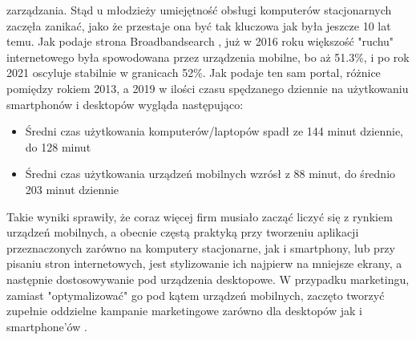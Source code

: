 \documentclass[12pt, a4paper]{article}
\begin{document}
\begin{sloppypar}
{{    zarządzania. Stąd u młodzieży umiejętność obsługi komputerów stacjonarnych
    zaczęła zanikać, jako że przestaje ona być tak kluczowa jak była jeszcze 10 lat
    temu. Jak podaje strona Broadbandsearch \cite{dvm}, już w 2016 roku większość "ruchu"
    internetowego była spowodowana przez urządzenia mobilne, bo aż 51.3\%, i po 
    rok 2021 oscyluje stabilnie w granicach 52\%. Jak podaje ten sam portal,
    różnice pomiędzy rokiem 2013, a 2019 w ilości czasu spędzanego dziennie na 
    użytkowaniu smartphonów i desktopów wygląda następująco:
    \begin{itemize}
      \item Średni czas użytkowania komputerów/laptopów spadł ze 144 minut dziennie, do 128 minut
      \item Średni czas użytkowania urządzeń mobilnych wzrósł z 88 minut, do średnio 203 minut dziennie 
    \end{itemize} 
    Takie wyniki sprawiły, że coraz więcej firm musiało zacząć liczyć się z 
    rynkiem urządzeń mobilnych, a obecnie częstą praktyką przy tworzeniu aplikacji 
    przeznaczonych zarówno na komputery stacjonarne, jak i smartphony, lub przy 
    pisaniu stron internetowych, jest stylizowanie ich najpierw na mniejsze ekrany,
    a następnie dostosowywanie pod urządzenia desktopowe. W przypadku marketingu, 
    zamiast "optymalizować" go pod kątem urządzeń mobilnych, zaczęto tworzyć zupełnie
    oddzielne kampanie marketingowe zarówno dla desktopów jak i smartphone'ów
    \cite{mobile_strategy}.
  }
}
\end{sloppypar}
\end{document}
